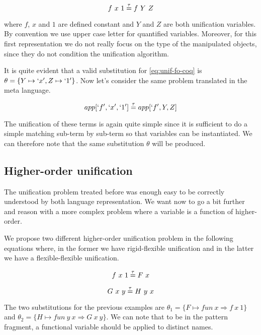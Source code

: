 \documentclass{rapport}
\begin{document}
\begin{equation}
  f\ x\ 1 \mathrel{\overset{\mathrm{\tau}}{=}} f\ Y\ Z
  \label{eq:unif-fo-coq}
\end{equation}

\noindent where $f$, $x$ and $1$ are defined constant and $Y$ and $Z$ are both
unification variables. By convention we use upper case letter for quantified
variables. Moreover, for this first representation we do not really focus on the
type of the manipulated objects, since they do not condition the unification
algorithm.

It is quite evident that a valid substitution for \cref{eq:unif-fo-coq} is $\theta =
\{Y \mapsto `x', Z \mapsto `1'\}$. Now let's consider the same problem translated in
the meta language.

\begin{equation}
  app[`f', `x', `1'] \mathrel{\overset{\mathrm{\tau}}{=}} app[`f', Y, Z]
  \label{eq:unif-fo-elpi}
\end{equation}

The unification of these terms is again quite simple since it is sufficient to
do a simple matching sub-term by sub-term so that variables can be instantiated.
We can therefore note that the same substitution $\theta$ will be produced.

\subsection{Higher-order unification}

The unification problem treated before was enough easy to be correctly
understood by both language representation. We want now to go a bit further and
reason with a more complex problem where a variable is a function of
higher-order. 

We propose two different higher-order unification problem in the following
equations where, in the former we have rigid-flexible unification and in the
latter we have a flexible-flexible unification.

\begin{equation}
  f\ x\ 1 \mathrel{\overset{\mathrm{\tau}}{=}} F\ x
  \label{eq:unif-ho-coq1}
\end{equation}

\begin{equation}
  G\ x\ y \mathrel{\overset{\mathrm{\tau}}{=}} H\ y\ x
  \label{eq:unif-ho-coq2}
\end{equation}

The two substitutions for the previous examples are $\theta_1 = \{F \mapsto fun\
x \Rightarrow f\ x\ 1\}$ and $\theta_2 = \{H \mapsto fun\ y\ x \Rightarrow G\ x\
y\}$. We can note that to be in the pattern fragment, a functional variable
should be applied to distinct names.
\end{document}
